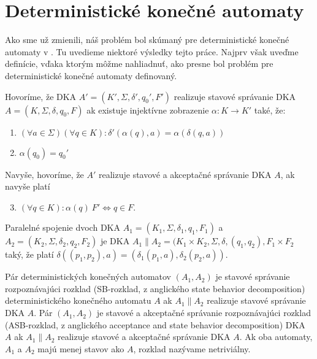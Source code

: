 \section{Deterministické konečné automaty}
Ako sme už zmienili, náš problém bol skúmaný pre deterministické konečné automaty v \cite{Gazi}. Tu uvedieme niektoré výsledky tejto práce. Najprv však uveďme definície, vďaka ktorým môžme nahliadnuť, ako presne bol problém pre deterministické konečné automaty definovaný.

\begin{definition}
Hovoríme, že DKA $ A'=(K',\Sigma,\delta',q_0',F') $ realizuje stavové správanie DKA $ A=(K,\Sigma,\delta,q_0,F) $ ak existuje injektívne zobrazenie $ \alpha: K \rightarrow K' $ také, že:

\begin{enumerate}[label=(\alph*)]
\item $(\forall a \in \Sigma)(\forall q \in K): \delta'(\alpha(q),a)=\alpha(\delta(q,a))$
\item $ \alpha(q_0) = q_0' $
\end{enumerate}

Navyše, hovoríme, že $ A' $ realizuje stavové a akceptačné správanie DKA $ A $, ak navyše platí

\begin{enumerate}[label=(\alph*)]
  \setcounter{enumi}{2}
  \item $(\forall q \in K): \alpha(q) \ F' \Leftrightarrow q \in F$.
\end{enumerate}

\end{definition}

\begin{definition}
Paralelné spojenie dvoch DKA $ A_1 = (K_1, \Sigma, \delta_1, q_1, F_1) $ a $ A_2 = (K_2, \Sigma, \delta_2, q_2, F_2) $ je DKA $ A_1 \parallel A_2 = (K_1 \times K_2, \Sigma, \delta, (q_1,q_2), F_1 \times F_2  $ taký, že platí $ \delta((p_1,p_2),a) = (\delta_1(p_1,a), \delta_2(p_2, a)) $.
\end{definition}

\begin{definition}
Pár deterministických konečných automatov $ (A_1, A_2) $ je stavové správanie rozpoznávajúci rozklad (SB-rozklad, z anglického state behavior decomposition) deterministického konečného automatu $ A $ ak $ A_1 \parallel A_2 $ realizuje stavové správanie DKA $ A $. Pár $ (A_1, A_2) $ je stavové a akceptačné správanie rozpoznávajúci rozklad (ASB-rozklad, z anglického acceptance and state behavior decomposition) DKA $ A $ ak $ A_1 \parallel A_2 $ realizuje stavové a akceptačné správanie  DKA $ A $. Ak oba automaty, $ A_1 $ a $ A_2 $ majú menej stavov ako $ A $, rozklad nazývame netriviálny.
\end{definition}

